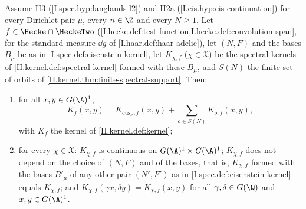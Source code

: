 Assume H3 (\cref{I.spec.hyp:langlands-l2}) and H2a (\cref{I.eis.hyp:eis-continuation}) for every Dirichlet pair $\mu$, every $n\in\Z$ and every $N\ge1$. Let
$f\in\Hecke\cap\HeckeTwo$ (\cref{I.hecke.def:test-function,I.hecke.def:convolution-span}, for the standard measure $\dd g$ of \cref{I.haar.def:haar-adelic}), let
$(N,F)$ and the bases $B_\mu$ be as in \cref{I.spec.def:eisenstein-kernel}, let $K_{\chi,f}$ ($\chi\in\mathfrak X$) be the spectral kernels of
\cref{II.kernel.def:spectral-kernel} formed with these $B_\mu$, and $S(N)$ the finite set of orbits of \cref{II.kernel.thm:finite-spectral-support}. Then:
\begin{enumerate}[label=(\alph*)]
\item for all $x,y\in G(\A)^1$,
\[
  K_f(x,y)=K_{\mathrm{cusp},f}(x,y)+\sum_{o\in S(N)}K_{o,f}(x,y),
\]
with $K_f$ the kernel of \cref{II.kernel.def:kernel};
\item for every $\chi\in\mathfrak X$: $K_{\chi,f}$ is continuous on $G(\A)^1\times G(\A)^1$; $K_{\chi,f}$ does not depend on the choice of $(N,F)$ and of the
  bases, that is, $K_{\chi,f}$ formed with the bases $B'_\mu$ of any other pair $(N',F')$ as in \cref{I.spec.def:eisenstein-kernel} equals $K_{\chi,f}$; and
  $K_{\chi,f}(\gamma x,\delta y)=K_{\chi,f}(x,y)$ for all $\gamma,\delta\in G(\Q)$ and $x,y\in G(\A)^1$.
\end{enumerate}
